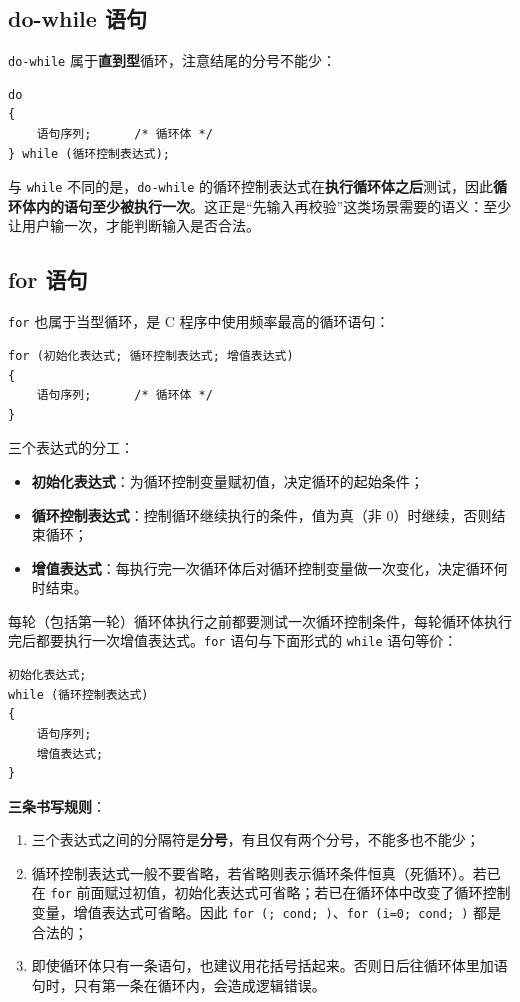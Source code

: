\subsection{do-while 语句}

\texttt{do-while} 属于\textbf{直到型}循环，注意结尾的分号不能少：

\begin{lstlisting}
do
{
    语句序列;      /* 循环体 */
} while (循环控制表达式);
\end{lstlisting}

与 \texttt{while} 不同的是，\texttt{do-while} 的循环控制表达式在\textbf{执行循环体之后}测试，因此\textbf{循环体内的语句至少被执行一次}。这正是“先输入再校验”这类场景需要的语义：至少让用户输一次，才能判断输入是否合法。

\subsection{for 语句}

\texttt{for} 也属于当型循环，是 C 程序中使用频率最高的循环语句：

\begin{lstlisting}
for (初始化表达式; 循环控制表达式; 增值表达式)
{
    语句序列;      /* 循环体 */
}
\end{lstlisting}

三个表达式的分工：

\begin{itemize}
  \item \textbf{初始化表达式}：为循环控制变量赋初值，决定循环的起始条件；
  \item \textbf{循环控制表达式}：控制循环继续执行的条件，值为真（非 0）时继续，否则结束循环；
  \item \textbf{增值表达式}：每执行完一次循环体后对循环控制变量做一次变化，决定循环何时结束。
\end{itemize}

每轮（包括第一轮）循环体执行之前都要测试一次循环控制条件，每轮循环体执行完后都要执行一次增值表达式。\texttt{for} 语句与下面形式的 \texttt{while} 语句等价：

\begin{lstlisting}
初始化表达式;
while (循环控制表达式)
{
    语句序列;
    增值表达式;
}
\end{lstlisting}

\textbf{三条书写规则}：

\begin{enumerate}
  \item 三个表达式之间的分隔符是\textbf{分号}，有且仅有两个分号，不能多也不能少；
  \item 循环控制表达式一般不要省略，若省略则表示循环条件恒真（死循环）。若已在 \texttt{for} 前面赋过初值，初始化表达式可省略；若已在循环体中改变了循环控制变量，增值表达式可省略。因此 \texttt{for (; cond; )}、\texttt{for (i=0; cond; )} 都是合法的；
  \item 即使循环体只有一条语句，也建议用花括号括起来。否则日后往循环体里加语句时，只有第一条在循环内，会造成逻辑错误。
\end{enumerate}

